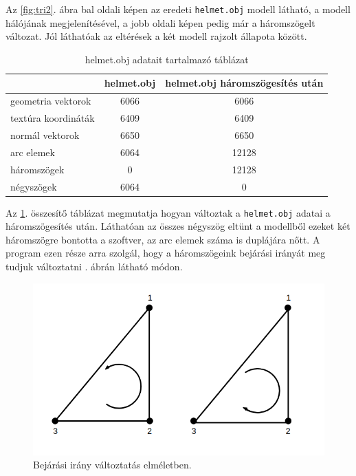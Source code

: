 Az \ref{fig:tri2}. ábra bal oldali képen az eredeti \texttt{helmet.obj} modell látható, a modell hálójának megjelenítésével, a jobb oldali képen pedig már a háromszögelt változat. Jól láthatóak az eltérések a két modell rajzolt állapota között.
\begin{table}[h]
\centering
\caption{helmet.obj adatait tartalmazó táblázat}
\bigskip
\label{tab:modellek}
\begin{tabular}{l|c|c|}
& helmet.obj & helmet.obj háromszögesítés után \\
\hline
geometria vektorok & 6066 & 6066 \\
textúra koordináták & 6409 & 6409 \\
normál vektorok & 6650 & 6650 \\
arc elemek & 6064 & 12128 \\
háromszögek & 0 & 12128 \\
négyszögek & 6064 & 0 \\
\hline
\end{tabular}
\label{fig:tri3}
\end{table}

Az \ref{fig:tri3}. összesítő táblázat megmutatja hogyan változtak a \texttt{helmet.obj} adatai a háromszögesítés után. Láthatóan az összes négyszög eltünt a modellből ezeket két háromszögre bontotta a szoftver, az arc elemek száma is duplájára nőtt.
\newpage
{}
\bigskip
A program ezen része arra szolgál, hogy a háromszögeink bejárási irányát meg tudjuk változtatni . ábrán látható módon.
\bigskip
\begin{figure}[h]
\centering
\includegraphics[scale=0.5]{images/bejarasi.png}
\caption{Bejárási irány változtatás elméletben.}
\label{fig:bej1}
\end{figure}
\bigskip

